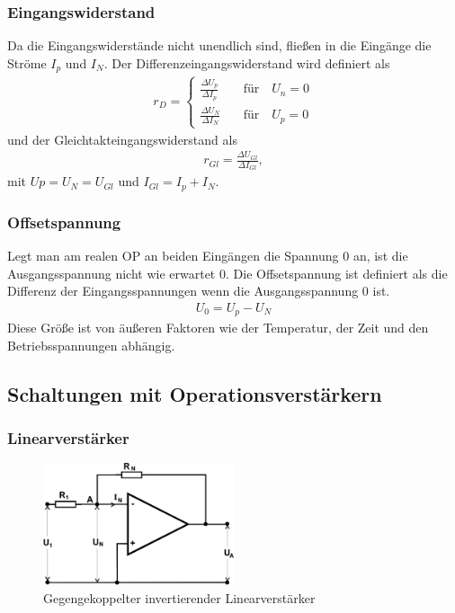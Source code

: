 \subsubsection{Eingangswiderstand}

Da die Eingangswiderstände nicht unendlich sind, fließen in die Eingänge die Ströme $I_p$ und $I_N$.
Der Differenzeingangswiderstand wird definiert als
\begin{align}
	r_D =
	\begin{cases}
		\frac{\Delta U_p}{\Delta I_p} \quad & \text{für} \quad U_n = 0\\
		\frac{\Delta U_N}{\Delta I_N} \quad & \text{für} \quad U_p = 0
	\end{cases}
\end{align}
und der Gleichtakteingangswiderstand als 
\begin{align}
	r_{Gl} = \frac{\Delta U_{Gl}}{\Delta I_{Gl}},
\end{align}
mit $Up = U_N = U_{Gl}$ und $I_{Gl} = I_p + I_N$.

\subsubsection{Offsetspannung}
Legt man am realen OP an beiden Eingängen die Spannung $0$ an, ist die Ausgangsspannung nicht wie erwartet $0$.
Die Offsetspannung ist definiert als die Differenz der Eingangsspannungen wenn die Ausgangsspannung $0$ ist.
\begin{align}
	U_0 = U_p - U_N
\end{align}
Diese Größe ist von äußeren Faktoren wie der Temperatur, der Zeit und den Betriebsspannungen abhängig.

\subsection{Schaltungen mit Operationsverstärkern}

\subsubsection{Linearverstärker}

\begin{figure}
	\centering
	\includegraphics[width=0.5\textwidth]{img/linamp.png}
	\caption{Gegengekoppelter invertierender Linearverstärker \cite{v51}}
	\label{fig:linamp}
\end{figure}

